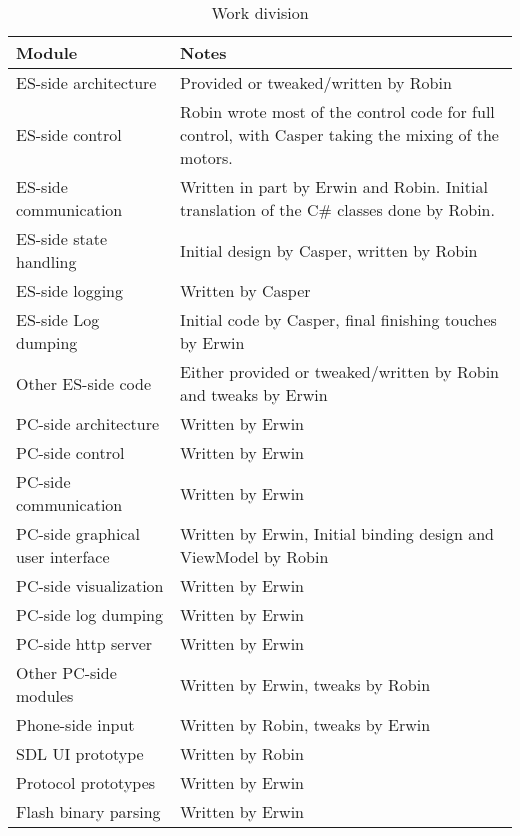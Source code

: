\documentclass[final]{article}
\begin{document}
\begin{table}[H]
    \caption{Work division}
    \label{tab:work-division}
    \centering

    \begin{tabular}{lp{10cm}}
    \toprule
    Module                   & Notes \\
    \midrule
    ES-side architecture & Provided or tweaked/written by Robin \\
    ES-side control & Robin wrote most of the control code for full control, with Casper taking the mixing of the motors. \\
    ES-side communication & Written in part by Erwin and Robin. Initial translation of the C\# classes done by Robin.\\
    ES-side state handling & Initial design by Casper, written by Robin \\
    ES-side logging & Written by Casper \\
    ES-side Log dumping & Initial code by Casper, final finishing touches by Erwin \\
    Other ES-side code & Either provided or tweaked/written by Robin and tweaks by Erwin \\
    \midrule
    PC-side architecture & Written by Erwin \\
    PC-side control & Written by Erwin \\
    PC-side communication & Written by Erwin \\
    PC-side graphical user interface & Written by Erwin, Initial binding design and ViewModel by Robin \\
    PC-side visualization & Written by Erwin \\
    PC-side log dumping & Written by Erwin \\
    PC-side http server & Written by Erwin \\
    Other PC-side modules & Written by Erwin, tweaks by Robin \\
    \midrule
    Phone-side input & Written by Robin, tweaks by Erwin \\
    SDL UI prototype & Written by Robin \\
    Protocol prototypes & Written by Erwin \\
    Flash binary parsing & Written by Erwin \\
    \bottomrule
    \end{tabular}
\end{table}
\end{document}
